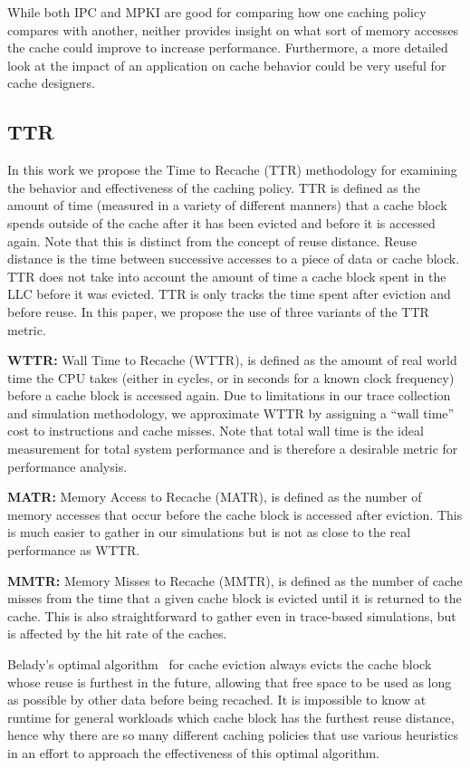 While both IPC and MPKI are good for comparing how one caching policy compares with another,
	neither provides insight on what sort of memory accesses the cache could improve to increase performance.
Furthermore, a more detailed look at the impact of an application on cache behavior could be very useful for cache designers.

\subsection{TTR}
\label{sec:metrics}
In this work we propose the Time to Recache (TTR) methodology for examining the behavior and effectiveness of the caching policy.
TTR is defined as the amount of time (measured in a variety of different manners) that a cache block spends outside of the cache after it has been evicted and before it is accessed again.
Note that this is distinct from the concept of reuse distance. 
Reuse distance is the time between successive accesses to a piece of data or cache block. 
TTR does not take into account the amount of time a cache block spent in the LLC before it was evicted.  
TTR is only tracks the time spent after eviction and before reuse.
In this paper, we propose the use of three variants of the TTR metric. 

\textbf{WTTR:}
Wall Time to Recache (WTTR), is defined as the amount of real world time the CPU takes (either in cycles, or in seconds for a known clock frequency) before a cache block is accessed again.
Due to limitations in our trace collection and simulation methodology, we approximate WTTR by assigning a ``wall time'' cost to instructions and cache misses.
Note that total wall time is the ideal measurement for total system performance and is therefore a desirable metric for performance analysis.

\textbf{MATR:}
Memory Access to Recache (MATR), is defined as the number of memory accesses that occur before the cache block is accessed after eviction.
This is much easier to gather in our simulations but is not as close to the real performance as WTTR.

\textbf{MMTR:}
Memory Misses to Recache (MMTR), is defined as the number of cache misses from the time that a given cache block is evicted until it is returned to the cache.
This is also straightforward to gather even in trace-based simulations, but is affected by the hit rate of the caches.

Belady's optimal algorithm~\cite{belady66} for cache eviction always evicts the cache block whose reuse is furthest in the future,
 allowing that free space to be used as long as possible by other data before being recached.
It is impossible to know at runtime for general workloads which cache block has the furthest reuse distance,
 hence why there are so many different caching policies that use various heuristics in an effort to approach the effectiveness of this optimal algorithm.

